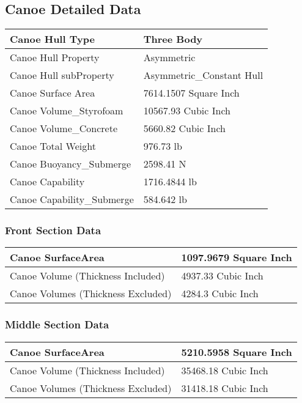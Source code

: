 \documentclass{article}%
\begin{document}
\subsection{Canoe Detailed Data}%
\label{subsec:CanoeDetailedData}%
\begin{tabular}{|l|l|}%
\hline%
Canoe Hull Type&Three Body \\%
\hline%
Canoe Hull Property&Asymmetric \\%
\hline%
Canoe Hull subProperty&Asymmetric\_Constant Hull \\%
\hline%
Canoe Surface Area&7614.1507 Square Inch\\%
\hline%
Canoe Volume\_Styrofoam&10567.93 Cubic Inch\\%
\hline%
Canoe Volume\_Concrete&5660.82 Cubic Inch\\%
\hline%
Canoe Total Weight&976.73 lb\\%
\hline%
Canoe Buoyancy\_Submerge&2598.41 N\\%
\hline%
Canoe Capability&1716.4844 lb\\%
\hline%
Canoe Capability\_Submerge&584.642 lb\\%
\hline%
\end{tabular}%
\subsubsection{Front Section Data}%
\label{ssubsec:FrontSectionData}%
\begin{tabular}{|l|l|}%
\hline%
Canoe SurfaceArea&1097.9679 Square Inch\\%
\hline%
Canoe Volume (Thickness Included)&4937.33 Cubic Inch\\%
\hline%
Canoe Volumes (Thickness Excluded)&4284.3 Cubic Inch\\%
\hline%
\end{tabular}

%
\subsubsection{Middle Section Data}%
\label{ssubsec:MiddleSectionData}%
\begin{tabular}{|l|l|}%
\hline%
Canoe SurfaceArea&5210.5958 Square Inch\\%
\hline%
Canoe Volume (Thickness Included)&35468.18 Cubic Inch\\%
\hline%
Canoe Volumes (Thickness Excluded)&31418.18 Cubic Inch\\%
\hline%
\end{tabular}
\end{document}

